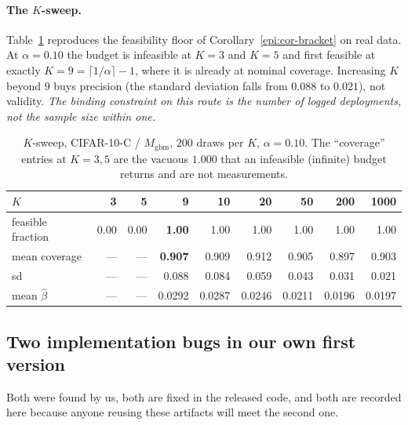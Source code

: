 \paragraph{The $K$-sweep.} Table~\ref{tab:k-sweep} reproduces the feasibility floor of
Corollary~\ref{epi:cor-bracket} on real data. At $\alpha=0.10$ the budget is infeasible at $K=3$ and
$K=5$ and first feasible at exactly $K=9=\lceil1/\alpha\rceil-1$, where it is already at nominal
coverage. Increasing $K$ beyond $9$ buys precision (the standard deviation falls from $0.088$ to
$0.021$), not validity. \emph{The binding constraint on this route is the number of logged
deployments, not the sample size within one.}

\begin{table}[t]\centering\footnotesize
\caption{$K$-sweep, CIFAR-10-C / $M_{\mathrm{gbm}}$, $200$ draws per $K$, $\alpha=0.10$.
The ``coverage'' entries at $K=3,5$ are the vacuous $1.000$ that an infeasible (infinite) budget
returns and are not measurements.}
\label{tab:k-sweep}
\begin{tabular}{@{}lrrrrrrrr@{}}
\toprule
$K$ & 3 & 5 & \textbf{9} & 10 & 20 & 50 & 200 & 1000\\
\midrule
feasible fraction & 0.00 & 0.00 & \textbf{1.00} & 1.00 & 1.00 & 1.00 & 1.00 & 1.00\\
mean coverage & --- & --- & \textbf{0.907} & 0.909 & 0.912 & 0.905 & 0.897 & 0.903\\
sd & --- & --- & 0.088 & 0.084 & 0.059 & 0.043 & 0.031 & 0.021\\
mean $\widehat\beta$ & --- & --- & 0.0292 & 0.0287 & 0.0246 & 0.0211 & 0.0196 & 0.0197\\
\bottomrule
\end{tabular}
\end{table}

\subsection{Two implementation bugs in our own first version}

Both were found by us, both are fixed in the released code, and both are recorded here because
anyone reusing these artifacts will meet the second one.

